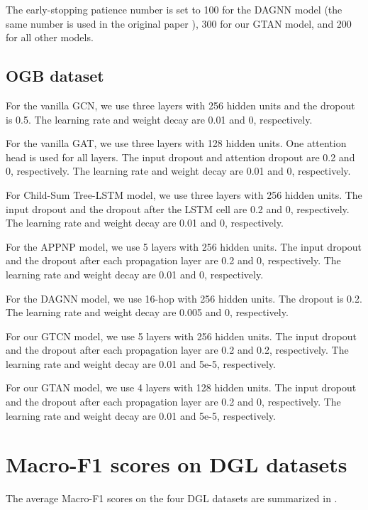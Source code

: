 \documentclass[lettersize,journal]{IEEEtran}
\theoremstyle{plain}
\theoremstyle{definition}
\theoremstyle{remark}
\begin{document}
The early-stopping patience number is set to 100 for the DAGNN model (the same number is used in the original paper \citep{liu2020towards}), 300 for our GTAN model, and 200 for all other models.

\subsection{OGB dataset}
For the vanilla GCN, we use three layers with 256 hidden units and the dropout is 0.5. The learning rate and weight decay are 0.01 and 0, respectively.

For the vanilla GAT, we use three layers with 128 hidden units. One attention head is used for all layers. The input dropout and attention dropout are 0.2 and 0, respectively. The learning rate and weight decay are 0.01 and 0, respectively.

For Child-Sum Tree-LSTM model, we use three layers with 256 hidden units. The input dropout and the dropout after the LSTM cell are 0.2 and 0, respectively. The learning rate and weight decay are 0.01 and 0, respectively. 

For the APPNP model, we use 5 layers with 256 hidden units. The input dropout and the dropout after each propagation layer are 0.2 and 0, respectively. The learning rate and weight decay are 0.01 and 0, respectively. 

For the DAGNN model, we use 16-hop with 256 hidden units. The dropout is 0.2. The learning rate and weight decay are 0.005 and 0, respectively. 

For our GTCN model, we use 5 layers with 256 hidden units. The input dropout and the dropout after each propagation layer are 0.2 and 0.2, respectively. The learning rate and weight decay are 0.01 and 5e-5, respectively.

For our GTAN model, we use 4 layers with 128 hidden units. The input dropout and the dropout after each propagation layer are 0.2 and 0, respectively. The learning rate and weight decay are 0.01 and 5e-5, respectively.

\section{Macro-F1 scores on DGL datasets}
\label{result:F1}
The average Macro-F1 scores on the four DGL datasets are summarized in .








\end{document}
